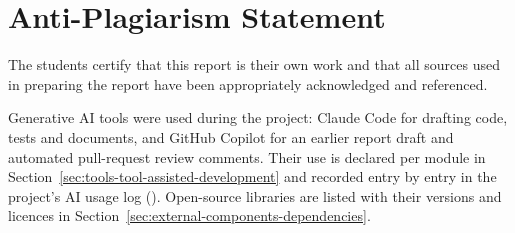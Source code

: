\chapter*{Anti-Plagiarism Statement}
The students certify that this report is their own work and that all sources used in preparing the report have been appropriately acknowledged and referenced.

Generative AI tools were used during the project: Claude Code for drafting code, tests and documents, and GitHub Copilot for an earlier report draft and automated pull-request review comments. Their use is declared per module in Section~\ref{sec:tools-tool-assisted-development} and recorded entry by entry in the project's AI usage log (). Open-source libraries are listed with their versions and licences in Section~\ref{sec:external-components-dependencies}.

